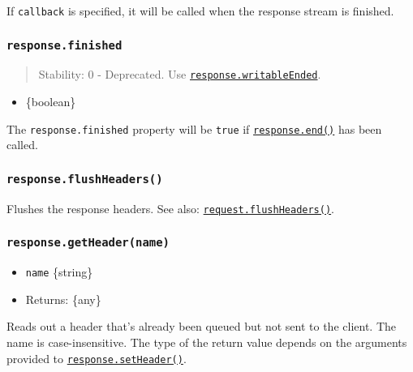If \texttt{callback} is specified, it will be called when the response
stream is finished.

\subsubsection{\texorpdfstring{\texttt{response.finished}}{response.finished}}\label{response.finished}

\begin{quote}
Stability: 0 - Deprecated. Use
\hyperref[responsewritableended]{\texttt{response.writableEnded}}.
\end{quote}

\begin{itemize}
\tightlist
\item
  \{boolean\}
\end{itemize}

The \texttt{response.finished} property will be \texttt{true} if
\hyperref[responseenddata-encoding-callback]{\texttt{response.end()}}
has been called.

\subsubsection{\texorpdfstring{\texttt{response.flushHeaders()}}{response.flushHeaders()}}\label{response.flushheaders}

Flushes the response headers. See also:
\hyperref[requestflushheaders]{\texttt{request.flushHeaders()}}.

\subsubsection{\texorpdfstring{\texttt{response.getHeader(name)}}{response.getHeader(name)}}\label{response.getheadername}

\begin{itemize}
\tightlist
\item
  \texttt{name} \{string\}
\item
  Returns: \{any\}
\end{itemize}

Reads out a header that's already been queued but not sent to the
client. The name is case-insensitive. The type of the return value
depends on the arguments provided to
\hyperref[responsesetheadername-value]{\texttt{response.setHeader()}}.


